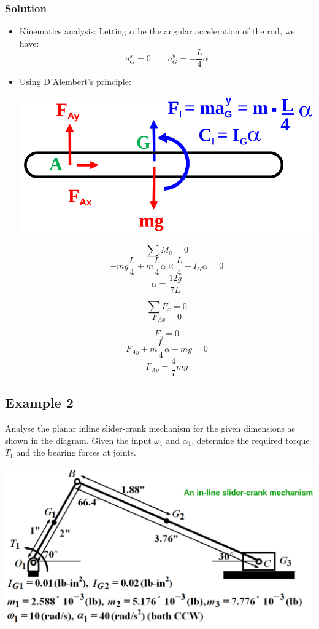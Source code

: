 \documentclass[11pt]{article}
\begin{document}
\subsubsection{Solution}
\label{sec:orga8bdc86}
\begin{itemize}
\item Kinematics analysis:
Letting \(\alpha\) be the angular acceleration of the rod, we have:
\[a_G^x = 0 \qquad a_G^y = - \frac{L}{4} \alpha\]
\item Using D'Alembert's principle:
\begin{center}
\includegraphics[width=.9\linewidth]{./images/dynamic-force-analysis-example-1-d-alembert-principle-diagram.png}
\end{center}
\[\sum M_a = 0\]
\[-mg \frac{L}{4} + m \frac{L}{4} \alpha \times \frac{L}{4} + I_G \alpha =0\]
\[\alpha = \frac{12g}{7L}\]

\[\sum F_x = 0\]
\[F_{Ax} = 0\]

\[F_y = 0\]
\[F_{Ay} + m \frac{L}{4} \alpha - mg = 0\]
\[F_{Ay} = \frac{4}{7} mg\]
\end{itemize}

 \newpage
\subsection{Example 2}
\label{sec:org299e7a9}
Analyse the planar inline slider-crank mechanism for the given dimensions as shown in the diagram. Given the input \(\omega_1\) and \(\alpha_1\), determine the required torque \(T_1\) and the bearing forces at joints.

\begin{center}
\includegraphics[width=.9\linewidth]{./images/dynamic-force-analysis-example-2-diagram.png}
\end{center}
\end{document}
